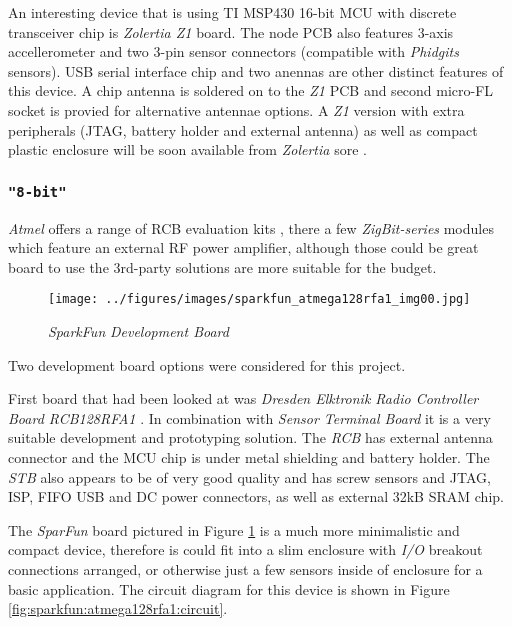  An interesting device that is using TI MSP430 16-bit MCU with
 discrete transceiver chip is \emph{Zolertia Z1} board. The node
 PCB also features 3-axis accellerometer and two 3-pin sensor
 connectors (compatible with \emph{Phidgits} sensors).
 USB serial interface chip and two anennas are other distinct
 features of this device. A chip antenna is soldered on to the
 \emph{Z1} PCB and second micro-FL socket is provied for
 alternative antennae options. A \emph{Z1} version with
 extra peripherals (JTAG, battery holder and external antenna)
 as well as compact plastic enclosure will be soon available
 from \emph{Zolertia} sore \cite{links:zolertia:store}.
 
\subsubsection{\texttt{"8-bit"}}

 \emph{Atmel} offers a range of RCB evaluation kits
 \cite{links:atmel:rcb}, there a few \emph{ZigBit-series}
 modules which feature an external RF power amplifier,
 although those could be great board to use the 3rd-party
 solutions are more suitable for the budget.

 \begin{figure}
 \texttt{[image: ../figures/images/sparkfun\_atmega128rfa1\_img00.jpg]}
 \caption{\emph{SparkFun}  \emph{Development Board}} \label{fig:sparkfun:atmega128rfa1:image}
 \end{figure}

 Two development board options were considered for this project.

 First  board that had been looked at 
 was \emph{Dresden Elktronik Radio Controller Board RCB128RFA1}
 \cite{links:de:rcb}. In combination with \emph{Sensor Terminal
 Board} \cite{links:de:stb} it is a very suitable development 
 and prototyping solution. The \emph{RCB} has external antenna
 connector and the MCU chip is under metal shielding and battery
 holder. The \emph{STB} also appears to be of very good quality
 and has screw sensors and JTAG, ISP, FIFO USB and DC power
 connectors, as well as external 32kB SRAM chip.

 The \emph{SparFun} board pictured in Figure
 \ref{fig:sparkfun:atmega128rfa1:image}
 is a much more minimalistic and compact device,
 therefore is could fit into a slim enclosure with
 \emph{I/O} breakout connections arranged, or otherwise
 just a few sensors inside of enclosure for a basic
 application. The circuit diagram for this device is
 shown in Figure \ref{fig:sparkfun:atmega128rfa1:circuit}.

